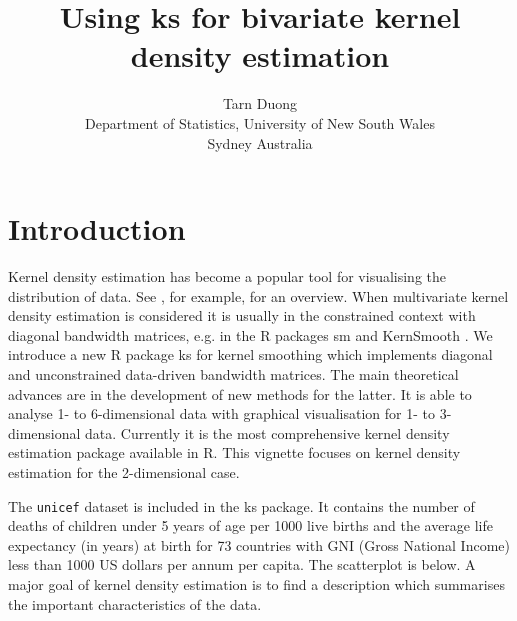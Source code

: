 \documentclass[a4paper,11pt]{article}
\title{Using ks for bivariate kernel density estimation}
\author{Tarn Duong \\Department of Statistics, University of New South Wales\\ Sydney Australia}
\let\code=\texttt
\let\proglang=\textsf
\newcommand{\pkg}[1]{{\normalfont\fontseries{b}\selectfont #1}}
\begin{document}
\maketitle

\section{Introduction}
  
Kernel density estimation has become a popular tool for visualising 
the distribution of data. See \citet*{simonoff1996}, for example, for
an overview.
When multivariate kernel density estimation is considered it is usually
in the constrained context with diagonal bandwidth matrices, e.g. 
in the \proglang{R} packages \pkg{sm} \citep*{sm} and \pkg{KernSmooth} 
\citep*{KernSmooth}.  
We introduce a new \proglang{R} package \pkg{ks} for kernel smoothing
which implements diagonal and unconstrained data-driven bandwidth matrices.
The main theoretical advances are in the development of new methods
for the latter.
It is able to analyse 1- to 6-dimensional
data with graphical visualisation for 1- to 3-dimensional data.  
Currently it is the most comprehensive kernel density estimation package 
available in \proglang{R}.
This vignette focuses on kernel density estimation for the 2-dimensional case.

The \code{unicef} dataset is included in the \pkg{ks} package. 
It contains the number of deaths of children under 5 years of age 
per 1000 live births and the average life expectancy
(in years) at birth for 73 countries with GNI (Gross National
Income) less than 1000 US dollars per annum per capita.
The scatterplot is below. A major goal of kernel density
estimation is to find a description which summarises
the important characteristics of the data.
\end{document}

